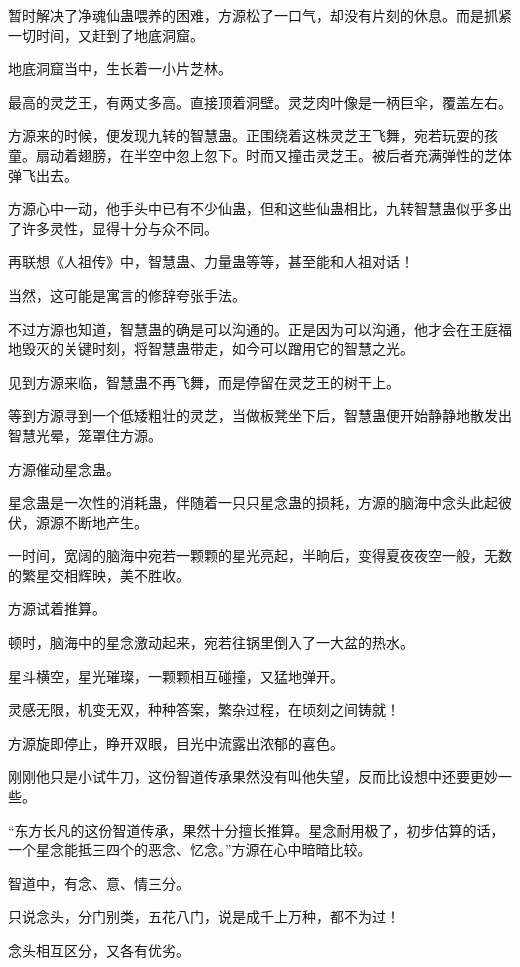 \begin{this_body}
暂时解决了净魂仙蛊喂养的困难，方源松了一口气，却没有片刻的休息。而是抓紧一切时间，又赶到了地底洞窟。

地底洞窟当中，生长着一小片芝林。

最高的灵芝王，有两丈多高。直接顶着洞壁。灵芝肉叶像是一柄巨伞，覆盖左右。

方源来的时候，便发现九转的智慧蛊。正围绕着这株灵芝王飞舞，宛若玩耍的孩童。扇动着翅膀，在半空中忽上忽下。时而又撞击灵芝王。被后者充满弹性的芝体弹飞出去。

方源心中一动，他手头中已有不少仙蛊，但和这些仙蛊相比，九转智慧蛊似乎多出了许多灵性，显得十分与众不同。

再联想《人祖传》中，智慧蛊、力量蛊等等，甚至能和人祖对话！

当然，这可能是寓言的修辞夸张手法。

不过方源也知道，智慧蛊的确是可以沟通的。正是因为可以沟通，他才会在王庭福地毁灭的关键时刻，将智慧蛊带走，如今可以蹭用它的智慧之光。

见到方源来临，智慧蛊不再飞舞，而是停留在灵芝王的树干上。

等到方源寻到一个低矮粗壮的灵芝，当做板凳坐下后，智慧蛊便开始静静地散发出智慧光晕，笼罩住方源。

方源催动星念蛊。

星念蛊是一次性的消耗蛊，伴随着一只只星念蛊的损耗，方源的脑海中念头此起彼伏，源源不断地产生。

一时间，宽阔的脑海中宛若一颗颗的星光亮起，半晌后，变得夏夜夜空一般，无数的繁星交相辉映，美不胜收。

方源试着推算。

顿时，脑海中的星念激动起来，宛若往锅里倒入了一大盆的热水。

星斗横空，星光璀璨，一颗颗相互碰撞，又猛地弹开。

灵感无限，机变无双，种种答案，繁杂过程，在顷刻之间铸就！

方源旋即停止，睁开双眼，目光中流露出浓郁的喜色。

刚刚他只是小试牛刀，这份智道传承果然没有叫他失望，反而比设想中还要更妙一些。

“东方长凡的这份智道传承，果然十分擅长推算。星念耐用极了，初步估算的话，一个星念能抵三四个的恶念、忆念。”方源在心中暗暗比较。

智道中，有念、意、情三分。

只说念头，分门别类，五花八门，说是成千上万种，都不为过！

念头相互区分，又各有优劣。


\end{this_body}
